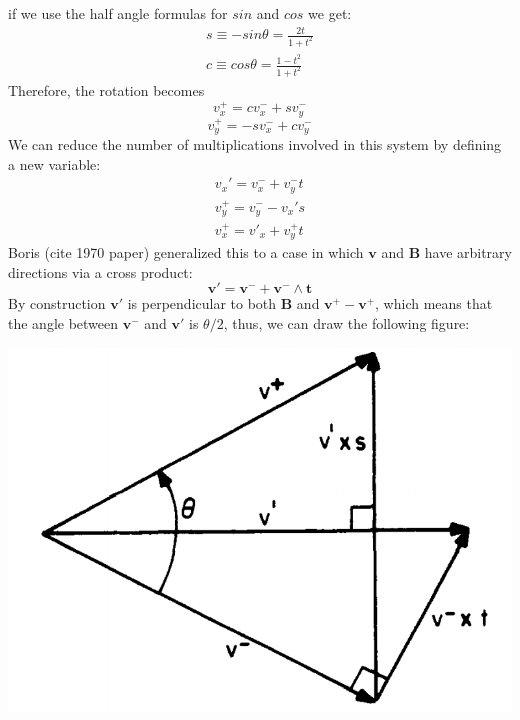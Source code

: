 \documentclass[12pt]{article}
\begin{document}
if we use the half angle formulas for $sin$ and $cos$ we get:
\begin{equation}\label{sandc}
\begin{split}
s\equiv -sin\theta =\frac{2t}{1+t^2}\\
c\equiv cos\theta=\frac{1-t^2}{1+t^2}
\end{split}
\end{equation}
Therefore, the rotation becomes
$$v_x^+=cv^-_x+sv^-_y$$
$$v_y^+=-sv^-_x+cv^-_y$$
We can reduce the number of multiplications involved in this system by defining a new variable:
\begin{equation}\label{Buneman}
\begin{split}
v_x'=v_x^-+v_y^-t\\
v_y^+=v_y^--v_x's\\
v_x^+=v'_x+v_y^+t
\end{split}
\end{equation} 
Boris (cite 1970 paper) generalized this to a case in which $\textbf{v}$ and $\textbf{B}$ have arbitrary directions via a cross product:
\begin{equation}\label{borisv'}
\textbf{v}'=\textbf{v}^-+\textbf{v}^-\wedge\textbf{t}
\end{equation}
By construction $\textbf{v}'$ is perpendicular to both $\textbf{B}$ and $\textbf{v}^+-\textbf{v}^+$, which means that the angle between $\textbf{v}^-$ and $\textbf{v}'$ is $\theta/2$, thus, we can draw the following figure:

\includegraphics[scale=0.4]{vprimerot}
\end{document}
